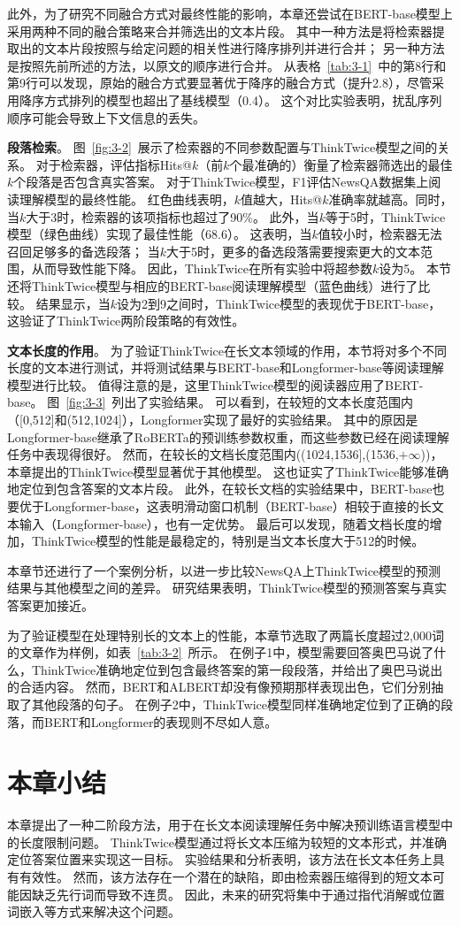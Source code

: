 此外，为了研究不同融合方式对最终性能的影响，本章还尝试在BERT-base模型上采用两种不同的融合策略来合并筛选出的文本片段。
其中一种方法是将检索器提取出的文本片段按照与给定问题的相关性进行降序排列并进行合并；
另一种方法是按照先前所述的方法，以原文的顺序进行合并。
从表格~\ref{tab:3-1}~中的第8行和第9行可以发现，原始的融合方式要显著优于降序的融合方式（提升2.8），尽管采用降序方式排列的模型也超出了基线模型（0.4）。
这个对比实验表明，扰乱序列顺序可能会导致上下文信息的丢失。




\textbf{段落检索}。
图~\ref{fig:3-2}~展示了检索器的不同参数配置与ThinkTwice模型之间的关系。
对于检索器，评估指标Hits@$k$（前$k$个最准确的）衡量了检索器筛选出的最佳$k$个段落是否包含真实答案。
对于ThinkTwice模型，F1评估NewsQA数据集上阅读理解模型的最终性能。
红色曲线表明，$k$值越大，Hits@$k$准确率就越高。同时，当$k$大于3时，检索器的该项指标也超过了90\%。
此外，当$k$等于5时，ThinkTwice模型（绿色曲线）实现了最佳性能（68.6）。
这表明，当$k$值较小时，检索器无法召回足够多的备选段落；
当$k$大于5时，更多的备选段落需要搜索更大的文本范围，从而导致性能下降。
因此，ThinkTwice在所有实验中将超参数$k$设为5。
本节还将ThinkTwice模型与相应的BERT-base阅读理解模型（蓝色曲线）进行了比较。
结果显示，当$k$设为2到9之间时，ThinkTwice模型的表现优于BERT-base，这验证了ThinkTwice两阶段策略的有效性。

\textbf{文本长度的作用}。
为了验证ThinkTwice在长文本领域的作用，本节将对多个不同长度的文本进行测试，并将测试结果与BERT-base和Longformer-base等阅读理解模型进行比较。
值得注意的是，这里ThinkTwice模型的阅读器应用了BERT-base。
图~\ref{fig:3-3}~列出了实验结果。
可以看到，在较短的文本长度范围内（[0,512]和(512,1024]），Longformer实现了最好的实验结果。
其中的原因是Longformer-base继承了RoBERTa的预训练参数权重，而这些参数已经在阅读理解任务中表现得很好。
然而，在较长的文档长度范围内((1024,1536],(1536,$+\infty$))，本章提出的ThinkTwice模型显著优于其他模型。
这也证实了ThinkTwice能够准确地定位到包含答案的文本片段。
此外，在较长文档的实验结果中，BERT-base也要优于Longformer-base，这表明滑动窗口机制（BERT-base）相较于直接的长文本输入（Longformer-base），也有一定优势。
最后可以发现，随着文档长度的增加，ThinkTwice模型的性能是最稳定的，特别是当文本长度大于512的时候。



本章节还进行了一个案例分析，以进一步比较NewsQA上ThinkTwice模型的预测结果与其他模型之间的差异。
研究结果表明，ThinkTwice模型的预测答案与真实答案更加接近。

为了验证模型在处理特别长的文本上的性能，本章节选取了两篇长度超过2,000词的文章作为样例，如表~\ref{tab:3-2}~所示。
在例子1中，模型需要回答奥巴马说了什么，ThinkTwice准确地定位到包含最终答案的第一段段落，并给出了奥巴马说出的合适内容。
然而，BERT和ALBERT却没有像预期那样表现出色，它们分别抽取了其他段落的句子。
在例子2中，ThinkTwice模型同样准确地定位到了正确的段落，而BERT和Longformer的表现则不尽如人意。


\section{本章小结}
本章提出了一种二阶段方法，用于在长文本阅读理解任务中解决预训练语言模型中的长度限制问题。
ThinkTwice模型通过将长文本压缩为较短的文本形式，并准确定位答案位置来实现这一目标。
实验结果和分析表明，该方法在长文本任务上具有有效性。
然而，该方法存在一个潜在的缺陷，即由检索器压缩得到的短文本可能因缺乏先行词而导致不连贯。
因此，未来的研究将集中于通过指代消解或位置词嵌入等方式来解决这个问题。


